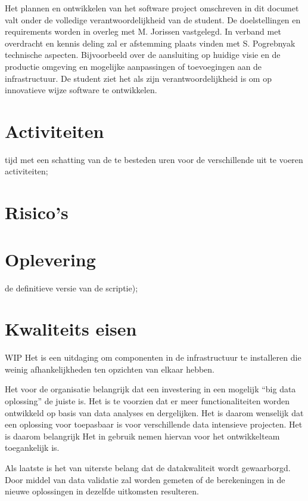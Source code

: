     Het plannen en ontwikkelen van het software project omschreven in dit documet valt onder de volledige verantwoordelijkheid van de student. De doelstellingen en requirements worden in overleg met M. Jorissen vastgelegd. In verband met overdracht en kennis deling zal er afstemming plaats vinden met S. Pogrebnyak technische aspecten. Bijvoorbeeld over de aansluiting op huidige visie en de productie omgeving en mogelijke aanpassingen of toevoegingen aan de infrastructuur.
    De student ziet het als zijn verantwoordelijkheid is om op innovatieve wijze software te ontwikkelen.


\section{Activiteiten} %
tijd met een schatting van de te besteden uren voor de verschillende uit te voeren activiteiten;

\section{Risico's} %

\section{Oplevering}

de definitieve versie van de scriptie);

\section{Kwaliteits eisen}

WIP
Het is een uitdaging om componenten in de infrastructuur te installeren die weinig afhankelijkheden ten opzichten van elkaar hebben.

Het voor de organisatie belangrijk dat een investering in een mogelijk “big data oplossing” de juiste is. Het is te voorzien dat er meer functionaliteiten worden ontwikkeld op basis van data analyses en dergelijken. Het is daarom wenselijk dat een oplossing voor toepasbaar is voor verschillende data intensieve projecten. Het is daarom belangrijk Het in gebruik nemen hiervan voor het ontwikkelteam toegankelijk is.

Als laatste is het van uiterste belang dat de datakwaliteit wordt gewaarborgd. Door middel van data validatie zal worden gemeten of de berekeningen in de nieuwe oplossingen in dezelfde uitkomsten resulteren.
